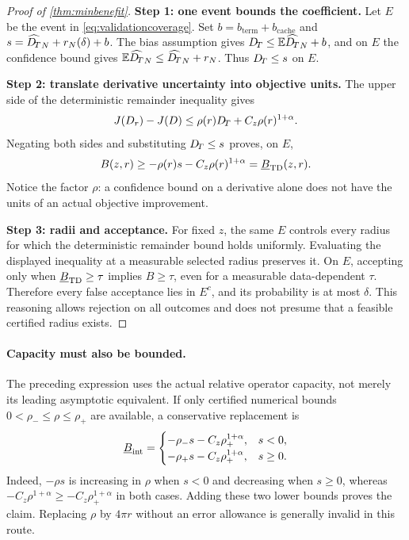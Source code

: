 \begin{proof}[Proof of \cref{thm:minbenefit}]
\textbf{Step 1: one event bounds the coefficient.}
Let $E$ be the event in \cref{eq:validationcoverage}. Set
$b=b_{\mathrm{term}}+b_{\mathrm{cache}}$ and
$s=\widehat{D_{\!T}}_N+r_N(\delta)+b$. The bias assumption gives
$D_{\!T}\le\mathbb{E}\widehat{D_{\!T}}_N+b$, and on $E$ the confidence bound gives
$\mathbb{E}\widehat{D_{\!T}}_N\le\widehat{D_{\!T}}_N+r_N$. Thus $D_{\!T}\le s$ on $E$.

\textbf{Step 2: translate derivative uncertainty into objective units.}
The upper side of the deterministic remainder inequality gives
\[
 J(D_r)-J(D)\le\rho(r)D_{\!T}+C_z\rho(r)^{1+\alpha}.
\]
Negating both sides and substituting $D_{\!T}\le s$ proves, on $E$,
\[
 B(z,r)\ge-\rho(r)s-C_z\rho(r)^{1+\alpha}
             =\underline B_{\rm TD}(z,r).
\]
Notice the factor $\rho$: a confidence bound on a derivative alone does not
have the units of an actual objective improvement.

\textbf{Step 3: radii and acceptance.}
For fixed $z$, the same $E$ controls every radius for which the deterministic
remainder bound holds uniformly. Evaluating the displayed inequality at a
measurable selected radius preserves it. On $E$, accepting only when
$\underline B_{\rm TD}\ge\tau$ implies $B\ge\tau$, even for a measurable
data-dependent $\tau$. Therefore every false acceptance lies in $E^c$, and
its probability is at most $\delta$. This reasoning allows rejection on all
outcomes and does not presume that a feasible certified radius exists.
\end{proof}

\paragraph{Capacity must also be bounded.}
The preceding expression uses the actual relative operator capacity, not
merely its leading asymptotic equivalent. If only certified numerical bounds
$0<\rho_-\le\rho\le\rho_+$ are available, a conservative replacement is
\begin{equation}
 \underline B_{\rm int}=
 \begin{cases}
 -\rho_-s-C_z\rho_+^{1+\alpha},&s<0,\\
 -\rho_+s-C_z\rho_+^{1+\alpha},&s\ge0.
 \end{cases}
 \label{eq:capacityintervalbenefit}
\end{equation}
Indeed, $-\rho s$ is increasing in $\rho$ when $s<0$ and decreasing when
$s\ge0$, whereas $-C_z\rho^{1+\alpha}\ge-C_z\rho_+^{1+\alpha}$ in both
cases. Adding these two lower bounds proves the claim. Replacing $\rho$ by
$4\pi r$ without an error allowance is generally invalid in this route.

